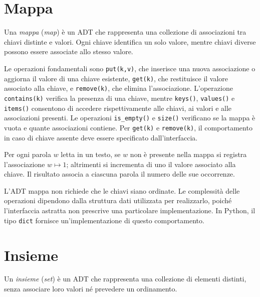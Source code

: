 \section{Mappa}
\label{sec:fi-adt-mappa}

\begin{definition}[Mappa]
\label{def:fi-adt-mappa}
Una \emph{mappa} (\emph{map}) è un ADT che rappresenta una
collezione di associazioni tra chiavi distinte e valori.
Ogni chiave identifica un solo valore, mentre chiavi diverse
possono essere associate allo stesso valore.
\end{definition}

Le operazioni fondamentali sono \texttt{put(k,v)}, che inserisce
una nuova associazione o aggiorna il valore di una chiave esistente,
\texttt{get(k)}, che restituisce il valore associato alla chiave,
e \texttt{remove(k)}, che elimina l'associazione.
L'operazione \texttt{contains(k)} verifica la presenza di una chiave,
mentre \texttt{keys()}, \texttt{values()} e \texttt{items()}
consentono di accedere rispettivamente alle chiavi, ai valori
e alle associazioni presenti. Le operazioni \texttt{is\_empty()}
e \texttt{size()} verificano se la mappa è vuota e quante
associazioni contiene. Per \texttt{get(k)} e \texttt{remove(k)},
il comportamento in caso di chiave assente deve essere
specificato dall'interfaccia.

\begin{example}
Per ogni parola \(w\) letta in un testo, se \(w\) non è presente
nella mappa si registra l'associazione \(w\mapsto1\); altrimenti
si incrementa di uno il valore associato alla chiave.
Il risultato associa a ciascuna parola il numero delle sue
occorrenze.
\end{example}

L'ADT mappa non richiede che le chiavi siano ordinate.
Le complessità delle operazioni dipendono dalla struttura dati
utilizzata per realizzarlo, poiché l'interfaccia astratta non
prescrive una particolare implementazione. In Python, il tipo
\texttt{dict} fornisce un'implementazione di questo comportamento.

\section{Insieme}
\label{sec:fi-adt-insieme}

\begin{definition}[Insieme]
\label{def:fi-adt-insieme}
Un \emph{insieme} (\emph{set}) è un ADT che rappresenta una
collezione di elementi distinti, senza associare loro valori
né prevedere un ordinamento.
\end{definition}

